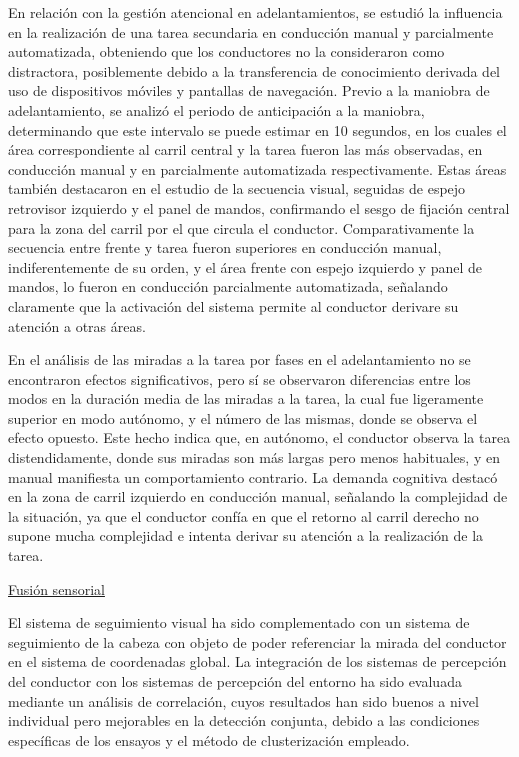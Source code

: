En relación con la gestión atencional en adelantamientos, se estudió la influencia en la realización de una tarea secundaria en conducción manual y parcialmente automatizada, obteniendo que los conductores no la consideraron como distractora, posiblemente debido a la transferencia de conocimiento derivada del uso de dispositivos móviles y pantallas de navegación. Previo a la maniobra de adelantamiento, se analizó el periodo de anticipación a la maniobra, determinando que este intervalo se puede estimar en 10 segundos, en los cuales el área correspondiente al carril central y la tarea fueron las más observadas, en conducción manual y en parcialmente automatizada respectivamente. Estas áreas también destacaron en el estudio de la secuencia visual, seguidas de espejo retrovisor izquierdo y el panel de mandos, confirmando el sesgo de fijación central para la zona del carril por el que circula el conductor. Comparativamente la secuencia entre frente y tarea fueron superiores en conducción manual, indiferentemente de su orden, y el área frente con espejo izquierdo y panel de mandos, lo fueron en conducción parcialmente automatizada, señalando claramente que la activación del sistema permite al conductor derivare su atención a otras áreas.   

En el análisis de las miradas a la tarea por fases en el adelantamiento no se encontraron efectos significativos, pero sí se observaron diferencias entre los modos en la duración media de las miradas a la tarea, la cual fue ligeramente superior en modo autónomo, y el número de las mismas, donde se observa el efecto opuesto. Este hecho indica que, en autónomo, el conductor observa la tarea distendidamente, donde sus miradas son más largas pero menos habituales, y en manual manifiesta un comportamiento contrario. La demanda cognitiva destacó en la zona de carril izquierdo en conducción manual, señalando la complejidad de la situación, ya que el conductor confía en que el retorno al carril derecho no supone mucha complejidad e intenta derivar su atención a la realización de la tarea. 

\underline{Fusión sensorial} 

El sistema de seguimiento visual ha sido complementado con un sistema de seguimiento de la cabeza con objeto de poder referenciar la mirada del conductor en el sistema de coordenadas global. La integración de los sistemas de percepción del conductor con los sistemas de percepción del entorno ha sido evaluada mediante un análisis de correlación, cuyos resultados han sido buenos a nivel individual pero mejorables en la detección conjunta, debido a las condiciones específicas de los ensayos y el método de clusterización empleado.  

